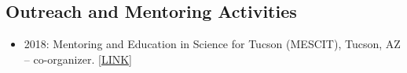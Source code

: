 \documentclass[11pt, oneside]{article}   	%
\begin{document}
\subsection*{Outreach and Mentoring Activities}
\begin{itemize}[noitemsep]
    \item 2018: Mentoring and Education in Science for Tucson (MESCIT), Tucson, AZ -- co-organizer. \href{https://ireneshivaei.weebly.com/mescit.html}{[LINK]}
\end{itemize}
\end{document}
